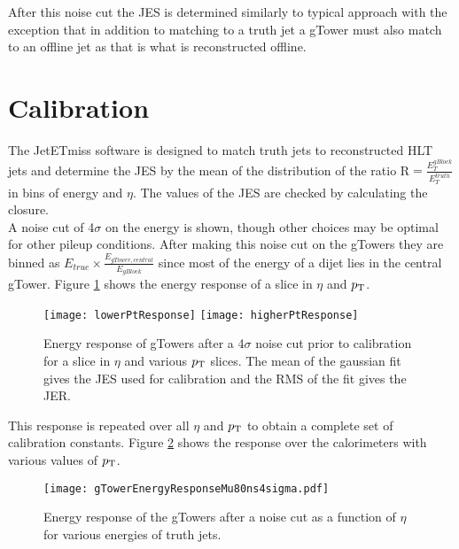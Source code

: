 After this noise cut the JES is determined similarly to typical approach with the exception that in addition to matching to a truth jet a gTower must also match to an offline jet as that is what is reconstructed offline.  


\section{Calibration}

The JetETmiss software is designed to match truth jets to reconstructed HLT jets and determine the JES by the mean of the distribution of the ratio R$=\frac{E_{T}^{gBlock}}{E_{T}^{truth}}$ in bins of energy and $\eta$.  The values of the JES are checked by calculating the closure. %
 \\
 
 A noise cut of 4$\sigma$ on the energy is shown, though other choices may be optimal for other pileup conditions.  After making this noise cut on the gTowers they are binned as $E_{true} \times \frac{E_{gTower, central}}{E_{gBlock}}$ since most of the energy of a dijet lies in the central gTower.  Figure \ref{fig:gTowerEnergyResponseSlice} shows the energy response of a slice in $\eta$ and $p_{\mathrm{T}}$.  \\



 \begin{figure}[h!]
  \centering
	\texttt{[image: lowerPtResponse]}
	\texttt{[image: higherPtResponse]}
\caption[Energy response of gTowers]{\label{fig:gTowerEnergyResponseSlice}{Energy response of gTowers after a 4$\sigma$ noise cut prior to calibration for a slice in $\eta$ and various $p_{\mathrm{T}}$ slices.  The mean of the gaussian fit gives the JES used for calibration and the RMS of the fit gives the JER.  }} 
\end{figure}

This response is repeated over all $\eta$ and $p_{\mathrm{T}}$ to obtain a complete set of calibration constants.  Figure \ref{fig:gTowerEnergyResponse} shows the response over the calorimeters with various values of $p_{\mathrm{T}}$. \\
 
 \begin{figure}[h!]
  \centering
	\texttt{[image: gTowerEnergyResponseMu80ns4sigma.pdf]}
\caption{\label{fig:gTowerEnergyResponse}{Energy response of the gTowers after a noise cut as a function of $\eta$ for various energies of truth jets.}} 
\end{figure}
 
